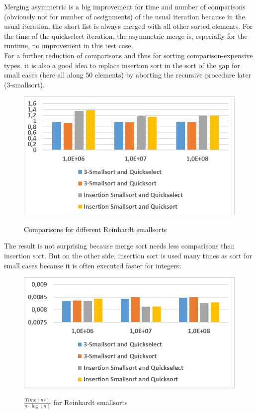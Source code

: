 \documentclass[11pt,pdftex,a4paper, twocolumn]{article}
\begin{document}
Merging asymmetric is a big improvement for time and number of comparisons (obviously not for number of assignments) of the usual iteration because in the usual iteration, the short list is always merged with all other sorted elements. For the time of the quickselect iteration, the asymmetric merge is, especially for the runtime, no improvement in this test case. \\
For a further reduction of comparisons and thus for sorting comparison-expensive types, it is also a good idea to replace insertion sort in the sort of the gap for small cases (here all along 50 elements) by aborting the recursive procedure later (3-smallsort).
\begin{figure}[H]
\includegraphics[width=\linewidth]{Diagramm-Bilder/comparisons-diff-iter-and-smallsorts.JPG} \\
\caption{Comparisons for different Reinhardt smallsorts} \label{fig:comparisons-diff-iter-and-smallsorts}
\end{figure}
The result is not surprising because merge sort needs less comparisons than insertion sort. But on the other side, insertion sort is used many times as sort for small cases because it is often executed faster for integers: \\
\begin{figure}[H]
\includegraphics[width=\linewidth]{Diagramm-Bilder/time-diff-iter-and-smallsorts.JPG} \\
\caption{ $ \frac{Time(ns)}{n \cdot \log(n)} $ for Reinhardt smallsorts} \label{fig:time-diff-iter-and-smallsorts}
\end{figure} 
\end{document}

